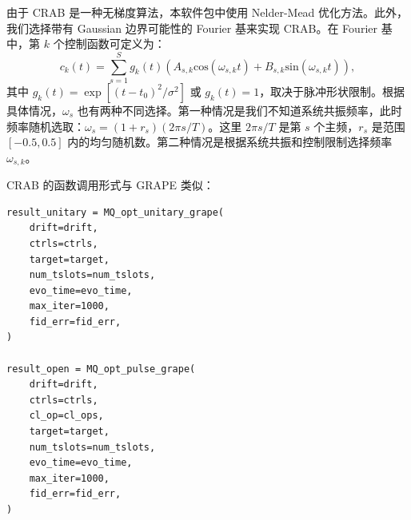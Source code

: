 由于 CRAB 是一种无梯度算法，本软件包中使用 Nelder-Mead 优化方法。此外，我们选择带有 Gaussian 边界可能性的 Fourier 基来实现 CRAB。在 Fourier 基中，第 $k$ 个控制函数可定义为：
\begin{equation}
    c_{k}(t)=\sum_{s=1}^{S}g_{k}(t)(A_{s,k}\mathrm{cos}(\omega_{s,k}t)+B_{s,k}\mathrm{sin}(\omega_{s,k}t)),
\end{equation}
其中 $g_{k}(t)=\exp\left[(t-t_{0})^{2}/\sigma^{2}\right]$ 或 $g_{k}(t)=1$，取决于脉冲形状限制。根据具体情况，$\omega_{s}$ 也有两种不同选择。第一种情况是我们不知道系统共振频率，此时频率随机选取：$\omega_{s}=(1+r_s)(2\pi s/T)$。这里 $2\pi s/T$ 是第 $s$ 个主频，$r_s$ 是范围 $[-0.5,0.5]$ 内的均匀随机数。第二种情况是根据系统共振和控制限制选择频率 ${\omega_{s,k}}$。

CRAB 的函数调用形式与 GRAPE 类似：
\begin{lstlisting}
result_unitary = MQ_opt_unitary_grape(
    drift=drift,
    ctrls=ctrls,
    target=target,
    num_tslots=num_tslots,
    evo_time=evo_time,
    max_iter=1000,
    fid_err=fid_err,
)

result_open = MQ_opt_pulse_grape(
    drift=drift,
    ctrls=ctrls,
    cl_op=cl_ops,
    target=target,
    num_tslots=num_tslots,
    evo_time=evo_time,
    max_iter=1000,
    fid_err=fid_err,
)
\end{lstlisting}

